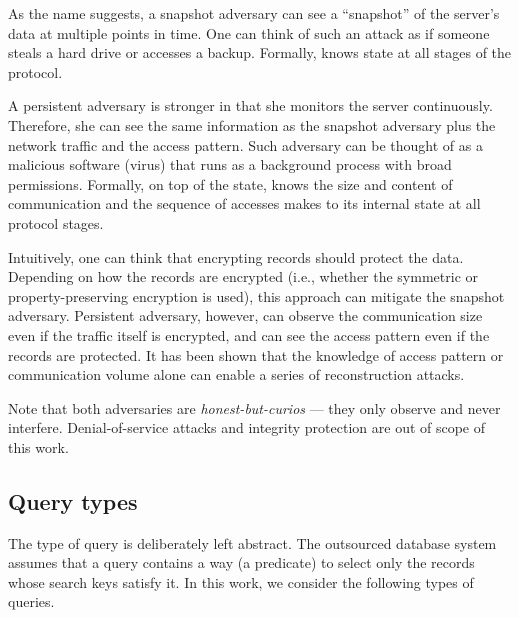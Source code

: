 			As the name suggests, a snapshot adversary can see a ``snapshot'' of the server's data at multiple points in time.
			One can think of such an attack as if someone steals a hard drive or accesses a backup.
			Formally, \adversary{} knows \server{} state at all stages of the protocol.

			A persistent adversary is stronger in that she monitors the server continuously.
			Therefore, she can see the same information as the snapshot adversary plus the network traffic and the access pattern.
			Such adversary can be thought of as a malicious software (virus) that runs as a background process with broad permissions.
			Formally, on top of the \server{} state, \adversary{} knows the size and content of \server{} communication and the sequence of accesses \server{} makes to its internal state at all protocol stages.

			Intuitively, one can think that encrypting records should protect the data.
			Depending on how the records are encrypted (i.e., whether the symmetric or property-preserving encryption is used), this approach can mitigate the snapshot adversary.
			Persistent adversary, however, can observe the communication size even if the traffic itself is encrypted, and can see the access pattern even if the records are protected.
			It has been shown that the knowledge of access pattern \cite{multidimensional-range-queries, inference-attack-islam-14, leakage-abuse-attacks-cash-15, inference-attacks-naveed-15, generic-attacks-kellaris, attacks-tao-of-inference, grubbs-attacks, access-pattern-disclosure, attacks-improved-reconstruction} or communication volume \cite{generic-attacks-kellaris, state-of-uniform, attacks-improved-reconstruction, pump-volume-attacks, volume-range-attacks} alone can enable a series of reconstruction attacks.

			Note that both adversaries are \emph{honest-but-curios} --- they only observe and never interfere.
			Denial-of-service attacks and integrity protection are out of scope of this work.

		\subsection{Query types}\label{section:intro:model:query-types}

			The type of query \query{} is deliberately left abstract.
			The outsourced database system assumes that a query contains a way (a predicate) to select only the records whose search keys satisfy it.
			In this work, we consider the following types of queries.

